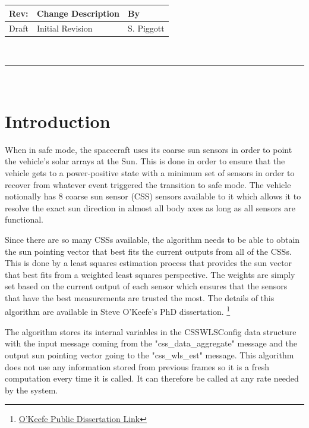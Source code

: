 \documentclass[]{LASPreport}
\begin{document}
\makeCover


%
%
\pagestyle{empty}
{\renewcommand{\arraystretch}{2}
\noindent
\begin{longtable}{|p{0.5in}|p{4.5in}|p{1.14in}|}
\hline
{\bfseries Rev}: & {\bfseries Change Description} & {\bfseries By} \\
\hline
Draft & Initial Revision & S. Piggott \\
\hline

\end{longtable}
}

\newpage
\setcounter{page}{1}
\pagestyle{fancy}

\tableofcontents
~\\ \hrule ~\\

\section{Introduction}
When in safe mode, the spacecraft uses its coarse sun sensors in order to 
point the vehicle's solar arrays at the Sun.  This is done in order to ensure 
that the vehicle gets to a power-positive state with a minimum set of sensors 
in order to recover from whatever event triggered the transition to safe mode.  
The vehicle notionally has 8 coarse sun sensor (CSS) sensors available to it 
which allows it to resolve the exact sun direction in almost all body axes as 
long as all sensors are functional. 

Since there are so many CSSs available, the algorithm needs to be able to obtain 
the sun pointing vector that best fits the current outputs from all of the CSSs.  
This is done by a least squares estimation process that provides the sun vector 
that best fits from a weighted least squares perspective.  The weights are 
simply set based on the current output of each sensor which ensures that the 
sensors that have the best measurements are trusted the most.  The details of 
this algorithm are available in Steve O'Keefe's PhD dissertation. 
\footnote{\href{http://gradworks.umi.com/3704787.pdf}
   {O'Keefe Public Dissertation Link}}

The algorithm stores its internal variables in the CSSWLSConfig data structure 
with the input message coming from the "css\_data\_aggregate" message and the 
output sun pointing vector going to the "css\_wls\_est" message.  This 
algorithm does not use any information stored from previous frames so it is a 
fresh computation every time it is called.  It can therefore be called at any 
rate needed by the system.
\end{document}
